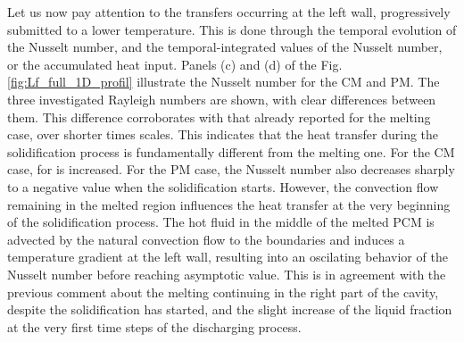 Let us now pay attention to the transfers occurring at the left wall, progressively submitted to a lower temperature. 
This is done through the temporal evolution of the Nusselt number,  and the temporal-integrated values of the Nusselt number, or the accumulated heat input.     
Panels (c) and (d) of the Fig. \ref{fig:Lf_full_1D_profil} illustrate the Nusselt number for the CM and PM.  
The three investigated Rayleigh numbers are shown, with clear differences between them. This difference corroborates with that already reported for the melting case, over shorter times scales.   This indicates that the heat transfer during the solidification process is fundamentally different from the melting one.
For the CM case, for   is increased. 
For the PM case, the Nusselt number also decreases sharply to a negative value when the solidification starts.
However, the convection flow remaining in the melted region influences the heat transfer at the very beginning of the solidification process.
The hot fluid in the middle of the melted PCM is advected by the natural convection flow to the boundaries and induces a temperature gradient at the left wall, resulting into an oscilating behavior of the Nusselt number before reaching asymptotic value.
This is in agreement with the previous comment about the melting continuing in the right part of the cavity, despite the solidification has started, and the slight increase of the liquid fraction at the very first time steps of the discharging process.


